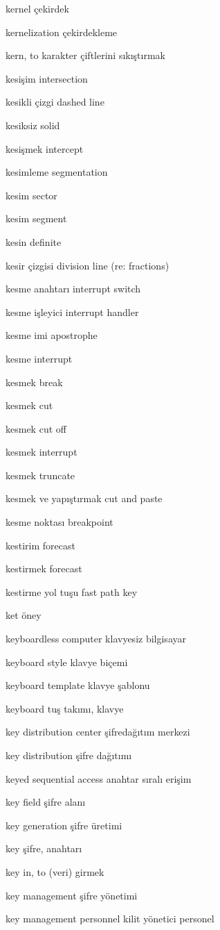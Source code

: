 \documentclass[12pt,fleqn]{article}\usepackage{../../common}
\begin{document}
kernel çekirdek

kernelization çekirdekleme

kern, to karakter çiftlerini sıkıştırmak

kesişim intersection

kesikli çizgi dashed line

kesiksiz solid

kesişmek intercept

kesimleme segmentation

kesim sector

kesim segment

kesin definite

kesir çizgisi division line (re: fractions)

kesme anahtarı interrupt switch

kesme işleyici interrupt handler

kesme imi apostrophe

kesme interrupt

kesmek break

kesmek cut

kesmek cut off

kesmek interrupt

kesmek truncate

kesmek ve yapıştırmak cut and paste

kesme noktası breakpoint

kestirim forecast

kestirmek forecast

kestirme yol tuşu fast path key

ket öney

keyboardless computer klavyesiz bilgisayar

keyboard style klavye biçemi

keyboard template klavye şablonu

keyboard tuş takımı, klavye

key distribution center şifredağıtım merkezi

key distribution şifre dağıtımı

keyed sequential access anahtar sıralı erişim

key field şifre alanı

key generation şifre üretimi

key şifre, anahtarı

key in, to (veri) girmek

key management şifre yönetimi

key management personnel kilit yönetici personel
\end{document}
